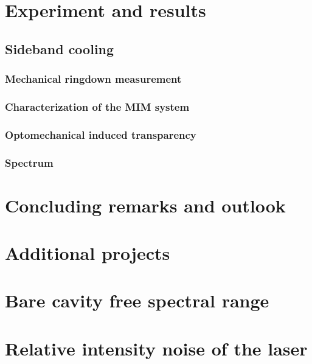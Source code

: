 \documentclass[12pt,twoside]{report}
\begin{document}
\chapter{Experiment and results}

\section{Sideband cooling}


\subsection{Mechanical ringdown measurement} \label{sec:q_fact}


\subsection{Characterization of the MIM system} \label{sec:char_mim}


\subsection{Optomechanical induced transparency} \label{sec:exp_omit}


\subsection{Spectrum} \label{sec:ex_spec}


\chapter{Concluding remarks and outlook}


\chapter{Additional projects}


\appendix
\chapter{Bare cavity free spectral range} \label{sec:bare_fsr}


\chapter{Relative intensity noise of the laser} \label{sec:rin}


\listoffigures

\listoftables

\printbibliography
\end{document}
